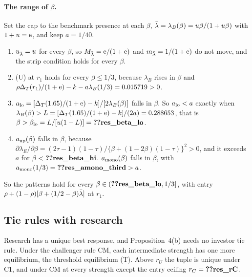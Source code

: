 \paragraph{The range of \(\beta\).} Set the cap to the benchmark presence at each \(\beta\), \(\bar\lambda=\lambda_B(\beta)=u\beta/(1+u\beta)\)
with \(1+u=\mathrm{e}\), and keep \(a=1/40\).
\begin{enumerate}[leftmargin=2em]
\item \(u_{\bar\lambda}=u\) for every \(\beta\), so \(M_{\bar\lambda}=\mathrm{e}/(1+\mathrm{e})\) and \(m_{\bar\lambda}=1/(1+\mathrm{e})\) do not move, and the strip
condition holds for every \(\beta\).
\item (U) at \(r_1\) holds for every \(\beta\le1/3\), because \(\lambda_B\) rises in \(\beta\) and
\(\rho\Delta_T(r_1)/(1+\mathrm{e})-k-a\lambda_B(1/3)=0.015719>0\). %
\item \(a_{\rm lo}=[\Delta_T(1.65)/(1+\mathrm{e})-k]/[2\lambda_B(\beta)]\) falls in \(\beta\). So \(a_{\rm lo}<a\) exactly when
\(\lambda_B(\beta)>L=[\Delta_T(1.65)/(1+\mathrm{e})-k]/(2a)=0.288653\), %
that is \(\beta>\beta_{\rm lo}=L/[u(1-L)]=\reg{res_beta_lo}\).
\item \(a_{\rm up}(\beta)\) falls in \(\beta\), because \(\partial\lambda_E/\partial\beta=(2\tau-1)(1-\tau)/\{\beta+(1-2\beta)(1-\tau)\}^2>0\),
and it exceeds \(a\) for \(\beta<\reg{res_beta_hi}\). \(a_{\rm mono}(\beta)\) falls in \(\beta\), with
\(a_{\rm mono}(1/3)=\reg{res_amono_third}>a\).
\end{enumerate}
So the patterns hold for every \(\beta\in(\reg{res_beta_lo},1/3]\), with entry \(\rho+(1-\rho)[\beta+(1/2-\beta)\bar\lambda]\) at
\(r_1\).

\subsection{Tie rules with research}\label{sec:09_research-ties}

\begin{resultbox}
Research has a unique best response, and Proposition~4(b) needs no investor tie rule. Under the challenger rule CM, each intermediate
strength has one more equilibrium, the threshold equilibrium (T). Above \(r_U\) the tuple is unique under C1, and under CM
at every strength except the entry ceiling \(r_C=\reg{res_rC}\).
\end{resultbox}

